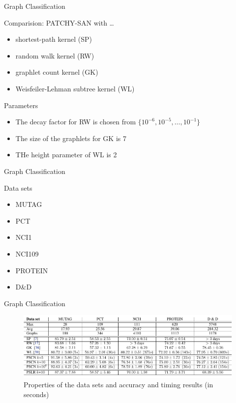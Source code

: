 \documentclass[dvipdfmx]{beamer}
\begin{document}
  \begin{frame}{Graph Classification}
    \begin{block}{Comparision: PATCHY-SAN with \dots}
      \begin{itemize}
        \item shortest-path kernel (SP)
        \item random walk kernel (RW)
        \item graphlet count kernel (GK)
        \item Weisfeiler-Lehman subtree kernel (WL)
      \end{itemize}
    \end{block}

    \begin{exampleblock}{Parameters}
      \begin{itemize}
        \item The decay factor for RW is chosen from $\{10^{-6}, 10^{-5}, \dots, 10^{-1}\}$
        \item The size of the graphlets for GK is 7
        \item THe height parameter of WL is 2
      \end{itemize}
    \end{exampleblock}
  \end{frame}

  \begin{frame}{Graph Classification}
    \begin{block}{Data sets}
      \begin{itemize}
        \item MUTAG
        \item PCT
        \item NCI1
        \item NCI109
        \item PROTEIN
        \item D\&D 
      \end{itemize}
    \end{block}
  \end{frame}

  \begin{frame}{Graph Classification}
    \begin{figure}[h]
      \centering
      \includegraphics[width=0.8\paperwidth]{img/Table1.pdf}
      \caption{Properties of the data sets and accuracy and timing results (in seconds)}
    \end{figure} 
  \end{frame}
\end{document}
